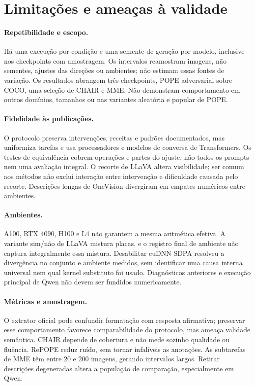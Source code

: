 \section{Limitações e ameaças à validade}
\paragraph{Repetibilidade e escopo.} Há uma execução por condição e uma semente de geração por modelo, inclusive nos checkpoints com amostragem. Os intervalos reamostram imagens, não sementes, ajustes das direções ou ambientes; não estimam essas fontes de variação. Os resultados abrangem três checkpoints, POPE adversarial sobre COCO, uma seleção de CHAIR e MME. Não demonstram comportamento em outros domínios, tamanhos ou nas variantes aleatória e popular de POPE.

\paragraph{Fidelidade às publicações.} O protocolo preserva intervenções, receitas e padrões documentados, mas uniformiza tarefas e usa processadores e modelos de conversa de Transformers. Os testes de equivalência cobrem operações e partes do ajuste, não todos os prompts nem uma avaliação integral. O recorte de LLaVA altera visibilidade; ser comum aos métodos não exclui interação entre intervenção e dificuldade causada pelo recorte. Descrições longas de OneVision divergiram em empates numéricos entre ambientes.

\paragraph{Ambientes.} A100, RTX 4090, H100 e L4 não garantem a mesma aritmética efetiva. A variante sim/não de LLaVA mistura placas, e o registro final de ambiente não captura integralmente essa mistura. Desabilitar cuDNN SDPA resolveu a divergência no conjunto e ambiente medidos, sem identificar uma causa interna universal nem qual kernel substituto foi usado. Diagnósticos anteriores e execução principal de Qwen não devem ser fundidos numericamente.

\paragraph{Métricas e amostragem.} O extrator oficial pode confundir formatação com resposta afirmativa; preservar esse comportamento favorece comparabilidade do protocolo, mas ameaça validade semântica. CHAIR depende de cobertura e não mede sozinho qualidade ou fluência. RePOPE reduz ruído, sem tornar infalíveis as anotações. As subtarefas de MME têm entre 20 e 200 imagens, gerando intervalos largos. Retirar descrições degeneradas altera a população de comparação, especialmente em Qwen.

